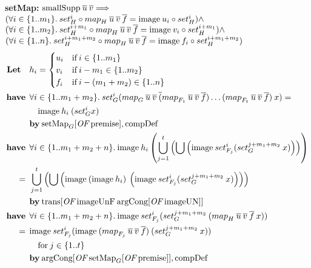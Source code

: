 \textbf{setMap:} $\text{smallSupp} \: \overline{u} \: \overline{v} \Longrightarrow$ \\
\hspace*{1.7em} $(\forall i \in \{1..m_1\}. \: set_H^i \circ {map}_{H} \: \overline{u} \: \overline{v} \: \overline{f} = \text{image} \: u_i \circ set_H^i) \wedge$ \\
\hspace*{1.7em} $(\forall i \in \{1..m_2\}. \: set_H^{i+m_1} \circ {map}_{H} \: \overline{u} \: \overline{v} \: \overline{f} = \text{image} \: v_i \circ set_H^{i+m_1}) \wedge$ \\
\hspace*{1.7em} $(\forall i \in \{1..n\}. \: set_H^{i+m_1+m_2} \circ {map}_{H} \: \overline{u} \: \overline{v} \: \overline{f} = \text{image} \: f_i \circ set_H^{i+m_1+m_2})$
\begin{align}
\textbf{Let} \quad & h_i = \begin{cases}
u_i & \text{if} \: i \in \{1..m_1\} \\
v_i & \text{if} \: i - m_1 \in \{1..m_2\} \\
f_i & \text{if} \: i - (m_1+m_2) \in \{1..n\}
\end{cases} \nonumber \\
\have & \forall i \in \{1..m_1+m_2\}. \: set_G^i (\map{G}{u}{v}(\map{F_1}{u}{v}{f})\dots(\map{F_t}{u}{v}{f}) \: x) = \nonumber \\*
 & \quad \text{image} \: h_i \: (set_G^i x) \label{set_map1} \\*
 & \by \OF{\text{setMap}_G}{\text{premise}}, \text{compDef} \nonumber \\
%
\have & \forall i \in \{1..m_1+m_2+n\}. \: \text{image} \: h_i \left( \bigcup_{j=1}^t \left(\bigcup \left( \text{image} \: set_{F_j}^i (set_G^{j+m_1+m_2} \: x) \right) \right) \right) \nonumber \\*
=\:\: & \bigcup_{j=1}^t \left( \bigcup \left( \text{image} \: (\text{image} \: h_i) \: \left( \text{image} \: set_{F_j}^i (set_G^{j+m_1+m_2} \: x) \right) \right) \right) \label{set_map2} \\*
 & \by \OF{\text{trans}}{\text{imageUnF} \: \OF{\text{argCong}}{\text{imageUN}}} \nonumber \\
%
\have & \forall i \in \{1..m_1+m_2+n\}. \: \text{image} \: set_{F_j}^i (set_G^{j+m_1+m_2} \: (\map{H}{u}{v}{f} \: x)) \nonumber \\*
=\:\: & \text{image} \: set_{F_j}^i (\text{image} \: (\map{F_j}{u}{v}{f}) \: (set_G^{j+m_1+m_2} \: x)) \label{set_map6} \\*
 & \quad \text{for} \: j \in \{1..t\} \nonumber \\*
 & \by \OF{\text{argCong}}{\OF{\text{setMap}_G}{\text{premise}}}, \text{compDef} \nonumber \\

\end{align}
